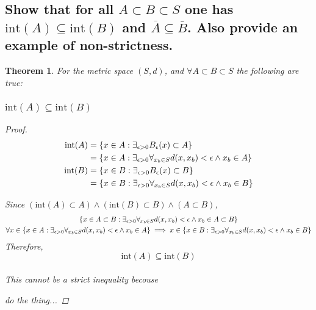 \documentclass[]{article}
\newtheorem{theorem}{Theorem}
\begin{document}
\subsection{Show that for all $A \subset B \subset S$ 
one has $\text{int}(A)\subseteq \text{int}(B)$ and $\overline{A}\subseteq\overline{B}$. 
Also provide an example of non-strictness.}

\begin{theorem}
    For the metric space $(S,d)$, and $\forall A \subset B \subset S$ the following are true: 
    \subsubsection{$\text{int}(A) \subseteq \text{int}(B)$}
    \begin{proof}
        \begin{align*}
            \text{int}(A) &= \qty{x \in A : \exists_{\epsilon>0} B_\epsilon(x) \subset A}\\
            &= \qty{x \in A : 
                \exists_{\epsilon>0} \forall_{x_b \in S} d(x,x_b)<\epsilon 
                \land x_b \in A}\\
            \text{int}(B) &= \qty{x \in B : \exists_{\epsilon>0} B_\epsilon(x) \subset B}\\
            &= \qty{x \in B : 
                \exists_{\epsilon>0} \forall_{x_b \in S} d(x,x_b)<\epsilon 
                \land x_b \in B}\\
        \end{align*}
        
        Since $(\text{int}(A) \subset A) \land (\text{int}(B) \subset B) \land (A \subset B)$,
        \begin{gather*}
            \qty{x \in A\subset B : 
                \exists_{\epsilon>0} \forall_{x_b \in S} d(x,x_b)<\epsilon 
                \land x_b \in A \subset B}\\
            \forall x \in \qty{x \in A : 
                \exists_{\epsilon>0} \forall_{x_b \in S} d(x,x_b)<\epsilon 
                    \land x_b \in A} 
                \implies x \in \qty{x \in B : 
                    \exists_{\epsilon>0} \forall_{x_b \in S} d(x,x_b)<\epsilon 
                        \land x_b \in B}
        \end{gather*}
        Therefore,
        $$\text{int}(A) \subseteq \text{int}(B)$$\\
        This cannot be a strict inequality becouse 

do the thing...


\end{proof}
\end{theorem}
\end{document}
